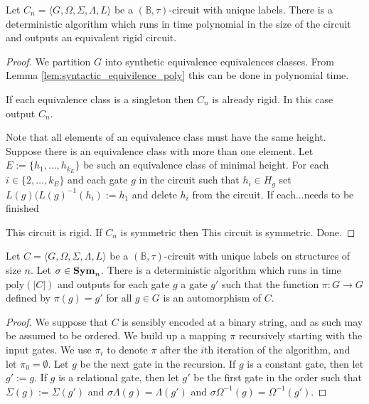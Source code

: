 \documentclass[../paper.tex]{subfiles}
\begin{document}
\begin{lem}
Let $C_n = \langle G, \Omega, \Sigma, \Lambda, L \rangle$ be a $(\mathbb{B}, \tau)$-circuit with unique labels. There is a deterministic algorithm which runs in time polynomial in the size of the circuit and outputs an equivalent rigid circuit.
\label{lem:rigidity_poly}
\end{lem}
\begin{proof}
We partition $G$ into synthetic equivalence equivalences classes. From Lemma \ref{lem:syntactic_equivilence_poly} this can be done in polynomial time.

If each equivalence class is a singleton then $C_n$ is already rigid. In this case output $C_n$.

Note that all elements of an equivalence class must have the same height. Suppose there is an equivalence class with more than one element. Let $E:= \{ h_1, \ldots , h_{k_E}\}$ be such an equivalence class of minimal height. For each $i \in \{2, \ldots , k_E \}$ and each gate $g$ in the circuit such that $h_i \in H_g$ set $L(g)(L(g)^{-1}(h_i) := h_1$ and delete $h_i$ from the circuit. If each...needs to be finished

This circuit is rigid. If $C_n$ is symmetric then This circuit is symmetric. Done.
\end{proof}


\begin{lem}
Let $C = \langle G, \Omega, \Sigma, \Lambda, L \rangle$ be a $(\mathbb{B}, \tau)$-circuit with unique labels on structures of size $n$. Let $\sigma \in \text{\textbf{Sym}}_n$. There is a deterministic algorithm which runs in time $\text{poly}(\vert C \vert)$ and outputs for each gate $g$ a gate $g'$ such that the function $\pi : G \rightarrow G$ defined by $\pi (g) = g'$ for all $g \in G$ is an automorphism of $C$.
\end{lem}
\begin{proof}
We suppose that $C$ is sensibly encoded at a binary string, and as such may be assumed to be ordered. We build up a mapping $\pi$ recursively starting with the input gates. We use $\pi_i$ to denote $\pi$ after the $i$th iteration of the algorithm, and let $\pi_0 = \emptyset$. Let $g$ be the next gate in the recursion. If $g$ is a constant gate, then let $g':= g$. If $g$ is a relational gate, then let $g'$ be the first gate in the order such that $\Sigma (g) := \Sigma (g')$ and $\sigma \Lambda (g) = \Lambda (g')$ and $\sigma \Omega^{-1} (g) = \Omega^{-1}(g')$.

\end{proof}
\end{document}
